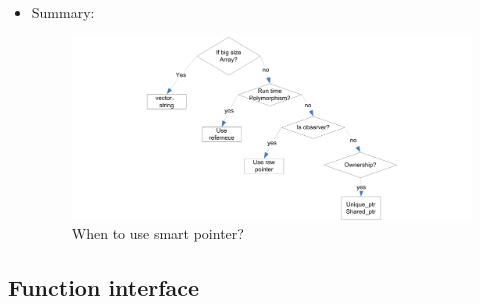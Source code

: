 \documentclass[a4paper,11pt,twoside]{book}
\begin{document}
\begin{itemize}
\item Summary:
\begin{figure}[h]
	\centering
	\includegraphics[width=0.8\linewidth]{pics/smartPointer}
	\caption{When to use smart pointer?}
	\label{fig:smartpointer}
\end{figure}


\end{itemize}

\subsection{Function interface}
\end{document}
